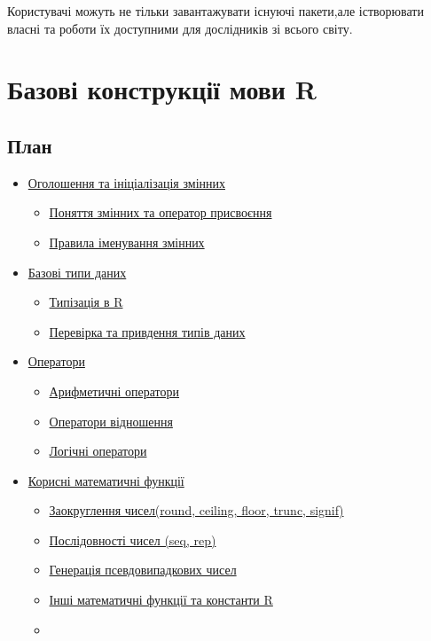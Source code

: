 \documentclass[
]{book}
\providecommand{\tightlist}{%
  \setlength{\itemsep}{0pt}\setlength{\parskip}{0pt}}
\begin{document}
Користувачі можуть не тільки завантажувати існуючі пакети,але істворювати власні та роботи їх доступними для дослідників зі всього світу.

\hypertarget{chapter2}{%
\chapter{Базові конструкції мови R}\label{chapter2}}

\hypertarget{ux43fux43bux430ux43d-1}{%
\section*{План}\label{ux43fux43bux430ux43d-1}}

\begin{itemize}
\tightlist
\item
  \protect\hyperlink{chapter21}{Оголошення та ініціалізація змінних}

  \begin{itemize}
  \tightlist
  \item
    \protect\hyperlink{chapter211}{Поняття змінних та оператор присвоєння}
  \item
    \protect\hyperlink{chapter212}{Правила іменування змінних}
  \end{itemize}
\item
  \protect\hyperlink{chapter22}{Базові типи даних}

  \begin{itemize}
  \tightlist
  \item
    \protect\hyperlink{chapter221}{Типізація в R}
  \item
    \protect\hyperlink{chapter222}{Перевірка та привдення типів даних}
  \end{itemize}
\item
  \protect\hyperlink{chapter23}{Оператори}

  \begin{itemize}
  \tightlist
  \item
    \protect\hyperlink{chapter231}{Арифметичні оператори}
  \item
    \protect\hyperlink{chapter232}{Оператори відношення}
  \item
    \protect\hyperlink{chapter233}{Логічні оператори}
  \end{itemize}
\item
  \protect\hyperlink{chapter24}{Корисні математичні функції}

  \begin{itemize}
  \item
    \protect\hyperlink{chapter241}{Заокруглення чисел(round, ceiling, floor, trunc, signif)}
  \item
    \protect\hyperlink{chapter242}{Послідовності чисел (seq, rep)}
  \item
    \protect\hyperlink{chapter243}{Генерація псевдовипадкових чисел}
  \item
    \protect\hyperlink{chapter244}{Інші математичні функції та константи R}
  \item ~
    \hypertarget{ux432ux432ux435ux434ux435ux43dux43dux44f-ux432ux438ux432ux435ux434ux43dux43dux44f-ux434ux430ux43dux438ux445}{%
}
\end{itemize}
\end{itemize}
\end{document}
